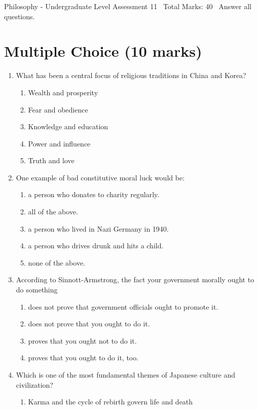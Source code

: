 \documentclass[12pt]{article}
\begin{document}
\begin{center}
Philosophy - Undergraduate Level Assessment 11 \
Total Marks: 40 \
Answer all questions.
\end{center}

\section*{Multiple Choice (10 marks)}
\begin{enumerate}[label=\arabic*.]
\item What has been a central focus of religious traditions in China and Korea?
\begin{enumerate}[label=(\alph*)]
    \item Wealth and prosperity
    \item Fear and obedience
    \item Knowledge and education
    \item Power and influence
    \item Truth and love
\end{enumerate}
\item One example of bad constitutive moral luck would be:
\begin{enumerate}[label=(\alph*)]
    \item a person who donates to charity regularly.
    \item all of the above.
    \item a person who lived in Nazi Germany in 1940.
    \item a person who drives drunk and hits a child.
    \item none of the above.
\end{enumerate}
\item According to Sinnott-Armstrong, the fact your government morally ought to do something
\begin{enumerate}[label=(\alph*)]
    \item does not prove that government officials ought to promote it.
    \item does not prove that you ought to do it.
    \item proves that you ought not to do it.
    \item proves that you ought to do it, too.
\end{enumerate}
\item Which is one of the most fundamental themes of Japanese culture and civilization?
\begin{enumerate}[label=(\alph*)]
    \item Karma and the cycle of rebirth govern life and death

\end{enumerate}
\end{enumerate}
\end{document}
